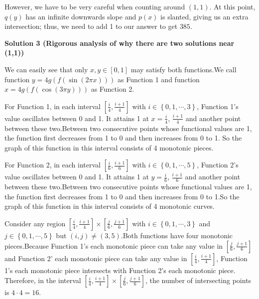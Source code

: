 \begin{enumerate}
 
However, we have to be very careful when counting around $(1, 1)$. At this point, $q(y)$ has an infinite downwards slope and $p(x)$ is slanted, giving us an extra intersection; thus, we need to add 1 to our answer to get $\boxed{385}$.

 



\textbf{Solution 3 (Rigorous analysis of why there are two solutions near (1,1))}

We can easily see that only $x, y \in \left[0,1 \right]$ may satisfy both functions.We call function $y = 4g \left( f \left( \sin \left( 2 \pi x \right) \right) \right)$ as Function 1 and function $x = 4g \left( f \left( \cos \left( 3 \pi y \right) \right) \right)$ as Function 2.

 For Function 1, in each interval $\left[ \frac{i}{4} , \frac{i+1}{4} \right]$ with $i \in \left\{ 0, 1, \cdots, 3 \right\}$, Function 1's value oscillates between 0 and 1. It attains 1 at $x = \frac{i}{4}$, $\frac{i+1}{4}$ and another point between these two.Between two consecutive points whose functional values are 1, the function first decreases from 1 to 0 and then increases from 0 to 1. So the graph of this function in this interval consists of 4 monotonic pieces.

 For Function 2, in each interval $\left[ \frac{i}{6} , \frac{i+1}{6} \right]$ with $i \in \left\{ 0, 1, \cdots, 5 \right\}$, Function 2's value oscillates between 0 and 1. It attains 1 at $y = \frac{i}{6}$, $\frac{i+1}{6}$ and another point between these two.Between two consecutive points whose functional values are 1, the function first decreases from 1 to 0 and then increases from 0 to 1.So the graph of this function in this interval consists of 4 monotonic curves.

 Consider any region $\left[ \frac{i}{4} , \frac{i+1}{4} \right] \times \left[ \frac{j}{6} , \frac{j+1}{6} \right]$ with $i \in \left\{ 0, 1, \cdots, 3 \right\}$ and $j \in \left\{0, 1, \cdots , 5 \right\}$ but $\left( i, j \right) \neq \left( 3, 5 \right)$.Both functions have four monotonic pieces.Because Function 1's each monotonic piece can take any value in  $\left[ \frac{j}{6} , \frac{j+1}{6} \right]$ and Function 2' each monotonic piece can take any value in  $\left[ \frac{i}{4} , \frac{i+1}{4} \right]$, Function 1's each monotonic piece intersects with Function 2's each monotonic piece. Therefore, in the interval $\left[ \frac{i}{4} , \frac{i+1}{4} \right] \times \left[ \frac{j}{6} , \frac{j+1}{6} \right]$, the number of intersecting points is $4 \cdot 4 = 16$.


\end{enumerate}
